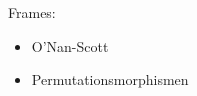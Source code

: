 \begin{frame}
Frames:
\begin{itemize}
\item O'Nan-Scott
\item Permutationsmorphismen
\end{itemize}
\end{frame}
